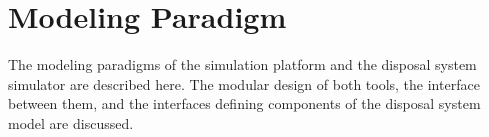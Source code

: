 \chapter{Modeling Paradigm}\label{ch:paradigm}

The modeling paradigms of the \Cyclus simulation platform and the \Cyder 
disposal system simulator are described here. The modular design of both tools, 
the interface between them, and the interfaces defining 
components of the \Cyder disposal system model are discussed. 




